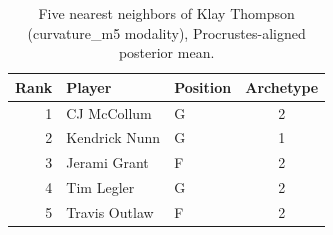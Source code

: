 \begin{table}[htbp]
  \centering\small
  \begin{tabular}{rllc}
    \toprule
    Rank & Player & Position & Archetype \\
    \midrule
    1 & CJ McCollum & G & 2 \\
    2 & Kendrick Nunn & G & 1 \\
    3 & Jerami Grant & F & 2 \\
    4 & Tim Legler & G & 2 \\
    5 & Travis Outlaw & F & 2 \\
    \bottomrule
  \end{tabular}
  \caption{Five nearest neighbors of Klay Thompson (curvature_m5 modality), Procrustes-aligned posterior mean.}
  \label{tab:Klay_Thompson_neighbors_curvature_m5}
\end{table}

